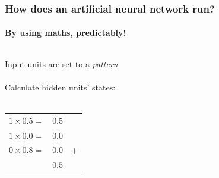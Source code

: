 \documentclass[mathserif]{beamer}
\begin{document}
\begin{frame}
\frametitle{How does an artificial neural network run?}
\framesubtitle{By using maths, predictably!}
  \begin{columns}[T]
    \begin{column}{.5\textwidth}
Input units are set to a \emph{pattern} \\
\ \\
Calculate hidden units' states: \\
\ \\
\begin{tabular}{r S[tabformat=3.2] r}%
 $1 \times 0.5 =$ & $0.5$ &\\
 $1 \times 0.0 =$ & $0.0$ &\\
 $0 \times 0.8 =$ & $0.0$ & +\\
 \hline
 & $0.5$ &
\end{tabular}


\end{column}
\end{columns}
\end{frame}
\end{document}
